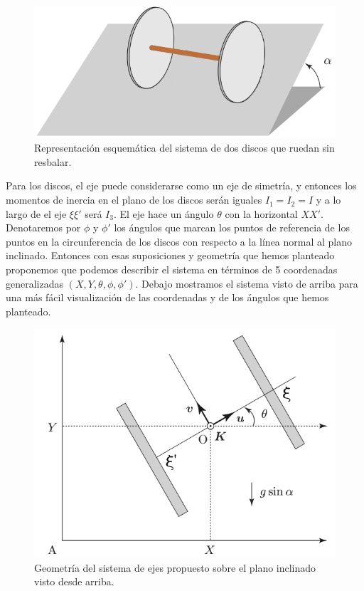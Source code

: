 \documentclass[a4paper,10pt]{article}
\numberwithin{equation}{section}
\begin{document}
\begin{figure}[H]
 \center
 \includegraphics[scale=0.4]{problema1fig1}
 \caption{Representación esquemática del sistema de dos discos que ruedan sin resbalar.}
 \label{fig:problema1fig1}
\end{figure}

Para los discos, el eje puede considerarse como un eje de simetría, y entonces los 
momentos de inercia en el plano de los discos serán iguales $I_1 = I_2 = I$ y a lo 
largo de el eje $\xi\xi'$ será $I_3$. El eje hace un ángulo $\theta$ con la horizontal 
$XX'$. Denotaremos por $\phi$ y $\phi'$ los ángulos que marcan los puntos de 
referencia de los puntos en la circunferencia de los discos con respecto a la línea 
normal al plano inclinado. Entonces con esas suposiciones y geometría que hemos 
planteado proponemos que podemos describir el sistema en términos de 5 coordenadas 
generalizadas $(X,Y,\theta,\phi,\phi')$. Debajo mostramos el sistema visto de arriba 
para una más fácil visualización de las coordenadas y de los ángulos que hemos 
planteado.

\begin{figure}[H]
 \center
 \includegraphics[scale=0.4]{problema1fig2}
 \caption{Geometría del sistema de ejes propuesto sobre el plano inclinado visto desde 
 arriba.}
 \label{fig:problema1fig2}
\end{figure}
\end{document}
